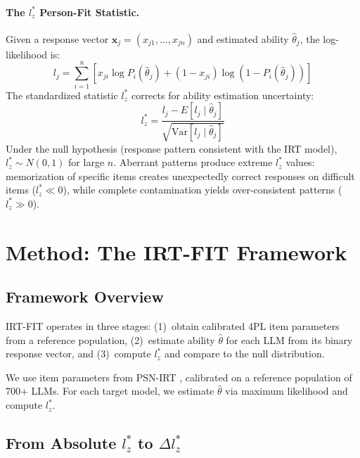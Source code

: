 \documentclass[11pt,a4paper]{article}
\begin{document}
\paragraph{The $l_z^*$ Person-Fit Statistic.}
Given a response vector $\mathbf{x}_j = (x_{j1}, \ldots, x_{jn})$ and estimated ability $\hat{\theta}_j$, the log-likelihood is:
\begin{equation}
l_j = \sum_{i=1}^{n} \left[ x_{ji} \log P_i(\hat{\theta}_j) + (1 - x_{ji}) \log(1 - P_i(\hat{\theta}_j)) \right]
\end{equation}
The standardized statistic $l_z^*$ \citep{snijders2001item} corrects for ability estimation uncertainty:
\begin{equation}
l_z^* = \frac{l_j - E[l_j \mid \hat{\theta}_j]}{\sqrt{\text{Var}[l_j \mid \hat{\theta}_j]}}
\end{equation}
Under the null hypothesis (response pattern consistent with the IRT model), $l_z^* \sim N(0,1)$ for large $n$. Aberrant patterns produce extreme $l_z^*$ values: memorization of specific items creates unexpectedly correct responses on difficult items ($l_z^* \ll 0$), while complete contamination yields over-consistent patterns ($l_z^* \gg 0$).


\section{Method: The IRT-FIT Framework}
\label{sec:method}

\subsection{Framework Overview}

IRT-FIT operates in three stages: (1)~obtain calibrated 4PL item parameters from a reference population, (2)~estimate ability $\hat{\theta}$ for each LLM from its binary response vector, and (3)~compute $l_z^*$ and compare to the null distribution.

We use item parameters from PSN-IRT \citep{gu2024psnirt}, calibrated on a reference population of 700+ LLMs. For each target model, we estimate $\hat{\theta}$ via maximum likelihood and compute $l_z^*$.

\subsection{From Absolute $l_z^*$ to $\Delta l_z^*$}
\end{document}
